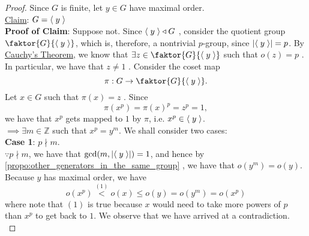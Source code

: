 \begin{proof}
  Since $G$ is finite, let $y \in G$ have maximal order. \\
  \underline{Claim}: $G = \langle \; y \; \rangle$ \\
  \textbf{Proof of Claim}: Suppose not. Since $\langle \; y \; \rangle \triangleleft G$ , consider the quotient group $\faktor{G}{\lra{y}}$, which is, therefore, a nontrivial $p$-group, since $\left|\langle \; y \; \rangle\right| = p$. By \hyperref[thm:cauchy]{Cauchy's Theorem}, we know that $\exists z \in \faktor{G}{\lra{y}}$ such that $o(z) = p$ . In particular, we have that $z \neq 1$ . Consider the coset map
  \begin{equation*}
    \pi : G \to \faktor{G}{\lra{y}}.
  \end{equation*}
  Let $x \in G$ such that $\pi(x) = z$ . Since
  \begin{equation*}
    \pi( x^p ) = \pi(x)^p = z^p = 1,
  \end{equation*}
  we have that $x^p$ gets mapped to $1$ by $\pi$, i.e. $x^p \in \langle \; y \; \rangle$. \\
  $\implies \exists m \in \mathbb{Z}$ such that $x^p = y^m$. We shall consider two cases: \\
  \noindent\textbf{Case 1}: $p \nmid m$. \\
  $\because p \nmid m$, we have that $\gcd(m, \left|\langle \; y \; \rangle\right|) = 1$, and hence by \cref{propo:other_generators_in_the_same_group} , we have that $o\left(y^m\right) = o(y)$. Because $y$ has maximal order, we have
  \begin{equation*}
    o( x^p ) \overset{(1)}{<} o(x) \leq o(y) = o(y^m) = o(x^p)
  \end{equation*}
  where note that $(1)$ is true because $x$ would need to take more powers of $p$ than $x^p$ to get back to $1$. We observe that we have arrived at a contradiction. \\

\end{proof}
